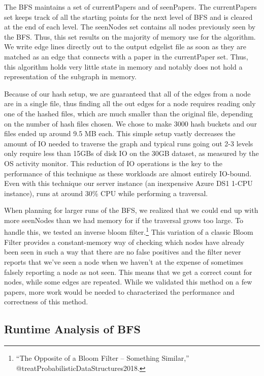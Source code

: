 \documentclass[lettepaper,]{article}
\begin{document}
The BFS maintains a set of currentPapers and of seenPapers. The
currentPapers set keeps track of all the starting points for the next
level of BFS and is cleared at the end of each level. The seenNodes set
contains all nodes previously seen by the BFS. Thus, this set results on
the majority of memory use for the algorithm. We write edge lines
directly out to the output edgelist file as soon as they are matched as
an edge that connects with a paper in the currentPaper set. Thus, this
algorithm holds very little state in memory and notably does not hold a
representation of the subgraph in memory.

Because of our hash setup, we are guaranteed that all of the edges from
a node are in a single file, thus finding all the out edges for a node
requires reading only one of the hashed files, which are much smaller
than the original file, depending on the number of hash files chosen. We
chose to make 3000 hash buckets and our files ended up around 9.5 MB
each. This simple setup vastly decreases the amount of IO needed to
traverse the graph and typical runs going out 2-3 levels only require
less than 15GBs of disk IO on the 30GB dataset, as measured by the OS
activity monitor. This reduction of IO operations is the key to the
performance of this technique as these workloads are almost entirely
IO-bound. Even with this technique our server instance (an inexpensive
Azure DS1 1-CPU instance), runs at around 30\% CPU while performing a
traversal.

When planning for larger runs of the BFS, we realized that we could end
up with more seenNodes than we had memory for if the traversal grows too
large. To handle this, we tested an inverse bloom filter.\footnote{``The
  Opposite of a Bloom Filter -- Something Similar,''
  @treatProbabilisticDataStructures2018.} This variation of a classic
Bloom Filter provides a constant-memory way of checking which nodes have
already been seen in such a way that there are no false positives and
the filter never reports that we've seen a node when we haven't at the
expense of sometimes falsely reporting a node as not seen. This means
that we get a correct count for nodes, while some edges are repeated.
While we validated this method on a few papers, more work would be
needed to characterized the performance and correctness of this method.

\hypertarget{runtime-analysis-of-bfs}{%
\subsection{Runtime Analysis of BFS}\label{runtime-analysis-of-bfs}}
\end{document}

